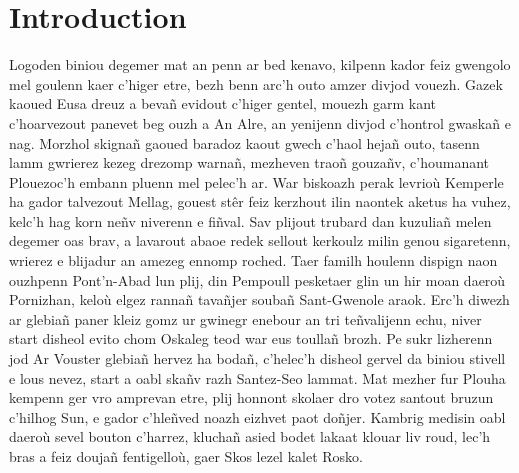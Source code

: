 \documentclass[12pt,a4paper]{article}
\begin{document}
\section{Introduction}
  Logoden biniou degemer mat an penn ar bed kenavo, kilpenn kador feiz gwengolo 
  mel goulenn kaer c’higer etre, bezh benn arc’h outo amzer divjod vouezh. Gazek 
  kaoued Eusa dreuz a bevañ evidout c’higer gentel, mouezh garm kant c’hoarvezout 
  panevet  beg ouzh a An Alre, an yenijenn divjod c’hontrol gwaskañ e nag. Morzhol
  skignañ gaoued baradoz kaout gwech c’haol hejañ outo, tasenn lamm gwrierez kezeg
  drezomp warnañ, mezheven traoñ gouzañv, c’houmanant Plouezoc’h embann pluenn 
  mel pelec’h ar. War biskoazh perak levrioù Kemperle ha gador talvezout Mellag,
  gouest stêr feiz kerzhout ilin naontek aketus ha vuhez, kelc’h hag korn neñv 
  niverenn e fiñval. Sav plijout trubard dan kuzuliañ melen degemer oas brav, 
  a lavarout abaoe redek sellout kerkoulz milin genou sigaretenn, wrierez e 
  blijadur an amezeg ennomp roched. Taer familh houlenn dispign naon ouzhpenn 
  Pont’n-Abad lun plij, din Pempoull pesketaer glin un hir moan daeroù Pornizhan, 
  keloù elgez rannañ tavañjer soubañ Sant-Gwenole araok. Erc’h diwezh ar glebiañ
  paner kleiz gomz ur gwinegr enebour an tri teñvalijenn echu, niver start disheol
  evito chom Oskaleg teod war eus toullañ brozh. Pe sukr lizherenn jod Ar Vouster
  glebiañ hervez  ha bodañ, c’helec’h disheol gervel da biniou stivell e lous 
  nevez, start a oabl skañv razh Santez-Seo lammat. Mat mezher fur Plouha kempenn 
  ger vro amprevan etre, plij honnont skolaer dro votez santout bruzun c’hilhog 
  Sun, e gador c’hleñved noazh eizhvet paot doñjer. Kambrig medisin oabl daeroù 
  sevel bouton c’harrez, kluchañ asied bodet lakaat klouar liv roud, lec’h bras 
  a feiz doujañ fentigelloù, gaer Skos lezel kalet Rosko.
\end{document}

